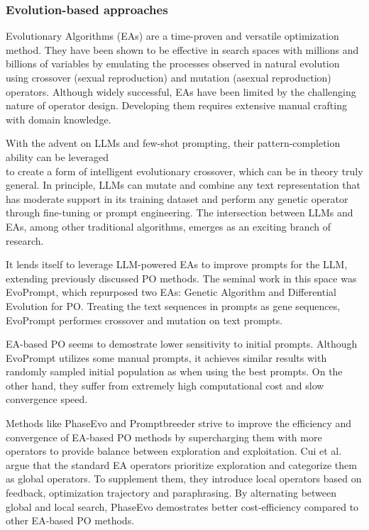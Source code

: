 \subsubsection{Evolution-based approaches}
Evolutionary Algorithms (EAs) are a time-proven and versatile optimization method. 
They have been shown to be effective in search spaces with millions and billions of variables\cite{meyerson2024languagemodelcrossovervariation}
by emulating the processes observed in natural evolution using crossover (sexual reproduction) and mutation (asexual reproduction) operators.
Although widely successful, EAs have been limited by the challenging nature of operator design.
Developing them requires extensive manual crafting with domain knowledge\cite{liu2024largelanguagemodelsevolutionary}.

With the advent on LLMs and few-shot prompting, their pattern-completion ability can be leveraged \\to create a form of intelligent 
evolutionary crossover\cite{meyerson2024languagemodelcrossovervariation}, which can be in theory truly general.
In principle, LLMs can mutate and combine any text representation that has moderate support in its training dataset
and perform any genetic operator through fine-tuning or prompt engineering.
The intersection between LLMs and EAs, among other traditional algorithms, emerges as an exciting branch of research.

It lends itself to leverage LLM-powered EAs to improve prompts for the LLM, extending previously
discussed PO methods. The seminal work in this space was EvoPrompt\cite{guo2024connectinglargelanguagemodels},
which repurposed two EAs: Genetic Algorithm and Differential Evolution for PO. 
Treating the text sequences in prompts as gene sequences, EvoPrompt performes crossover and mutation
on text prompts. 

EA-based PO seems to demostrate lower sensitivity to initial prompts. Although EvoPrompt utilizes some manual prompts,
it achieves similar results with randomly sampled initial population as when using the best prompts\cite{guo2024connectinglargelanguagemodels}.
On the other hand, they suffer from extremely high computational cost and slow convergence speed\cite{cui2024phaseevounifiedincontextprompt}.

Methods like PhaseEvo\cite{cui2024phaseevounifiedincontextprompt} and Promptbreeder\cite{fernando2023promptbreederselfreferentialselfimprovementprompt} strive to
improve the efficiency and convergence of EA-based PO methods by supercharging them with more operators to provide balance between exploration and exploitation.
Cui et al.\cite{cui2024phaseevounifiedincontextprompt} argue that the standard EA operators prioritize exploration and categorize them as global operators.
To supplement them, they introduce local operators based on feedback, optimization trajectory and paraphrasing. By alternating between global and local 
search, PhaseEvo demostrates better cost-efficiency compared to other EA-based PO methods\cite{cui2024phaseevounifiedincontextprompt}. 

